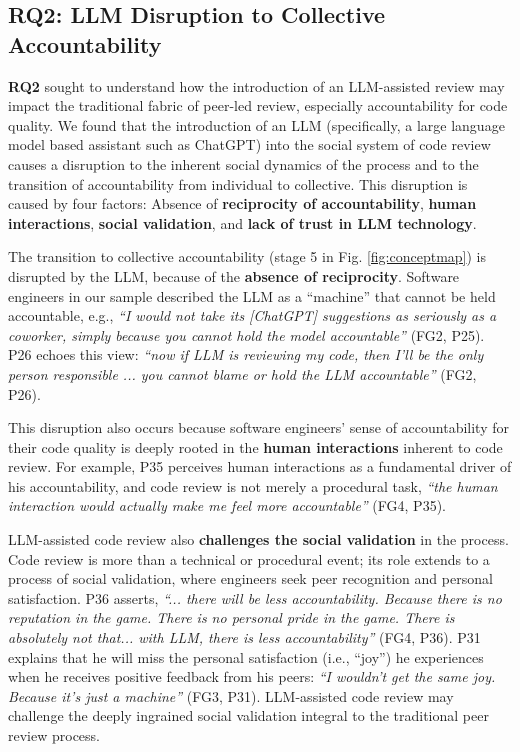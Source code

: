 \subsection{RQ2: LLM Disruption to Collective Accountability}

\textbf{RQ2} sought to understand how the introduction of an LLM-assisted review may impact the traditional fabric of peer-led review, especially accountability for code quality. We found that the introduction of an LLM (specifically, a large language model based assistant such as ChatGPT) into the social system of code review causes a disruption to the inherent social dynamics of the process and to the transition of accountability from individual to collective. This disruption is caused by four factors: Absence of \textbf{reciprocity of accountability}, \textbf{human interactions}, \textbf{social validation}, and \textbf{lack of trust in LLM technology}.

The transition to collective accountability (stage 5 in Fig. \ref{fig:conceptmap}) is disrupted by the LLM, because of the \textbf{absence of reciprocity}. Software engineers in our sample described the LLM as a ``machine'' that cannot be held accountable, e.g., \emph{``I would not take its [ChatGPT] suggestions as seriously as a coworker, simply because you cannot hold the model accountable''} (FG2, P25). P26 echoes this view: \emph{``now if LLM is reviewing my code, then I'll be the only person responsible ... you cannot blame or hold the LLM accountable''} (FG2, P26).

This disruption also occurs because software engineers' sense of accountability for their code quality is deeply rooted in the \textbf{human interactions} inherent to code review. For example, P35 perceives human interactions as a fundamental driver of his accountability, and code review is not merely a procedural task, \emph{``the human interaction would actually make me feel more accountable''} (FG4, P35).

LLM-assisted code review also \textbf{challenges the social validation} in the process. Code review is more than a technical or procedural event; its role extends to a process of social validation, where engineers seek peer recognition and personal satisfaction. P36 asserts, \emph{``... there will be less accountability. Because there is no reputation in the game. There is no personal pride in the game. There is absolutely not that... with LLM, there is less accountability''} (FG4, P36). P31 explains that he will miss the personal satisfaction (i.e., ``joy'') he experiences when he receives positive feedback from his peers: \emph{``I wouldn't get the same joy. Because it's just a machine''} (FG3, P31). LLM-assisted code review may challenge the deeply ingrained social validation integral to the traditional peer review process. 

